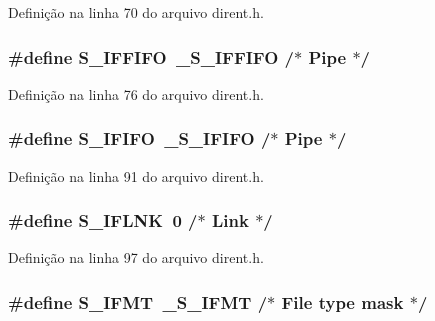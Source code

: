 Definição na linha 70 do arquivo dirent.\+h.

\subsubsection[{S\+\_\+\+I\+F\+F\+I\+FO}]{\setlength{\rightskip}{0pt plus 5cm}\#define S\+\_\+\+I\+F\+F\+I\+FO~\+\_\+\+S\+\_\+\+I\+F\+F\+I\+FO                   /$\ast$ Pipe $\ast$/}\label{dirent_8h_ad764ca408f6c7de6840f58da5d58c076}


Definição na linha 76 do arquivo dirent.\+h.

\subsubsection[{S\+\_\+\+I\+F\+I\+FO}]{\setlength{\rightskip}{0pt plus 5cm}\#define S\+\_\+\+I\+F\+I\+FO~\+\_\+\+S\+\_\+\+I\+F\+I\+FO                     /$\ast$ Pipe $\ast$/}\label{dirent_8h_a4966f25d9f03a7a06bc47ac729fd86cf}


Definição na linha 91 do arquivo dirent.\+h.

\subsubsection[{S\+\_\+\+I\+F\+L\+NK}]{\setlength{\rightskip}{0pt plus 5cm}\#define S\+\_\+\+I\+F\+L\+NK~0                          /$\ast$ {\bf Link} $\ast$/}\label{dirent_8h_afef163ce62372757e84bd9fc88c07aad}


Definição na linha 97 do arquivo dirent.\+h.

\subsubsection[{S\+\_\+\+I\+F\+MT}]{\setlength{\rightskip}{0pt plus 5cm}\#define S\+\_\+\+I\+F\+MT~\+\_\+\+S\+\_\+\+I\+F\+MT                     /$\ast$ File type mask $\ast$/}\label{dirent_8h_ab5bee51e9ee68b83ab11d4b340f7200b}


